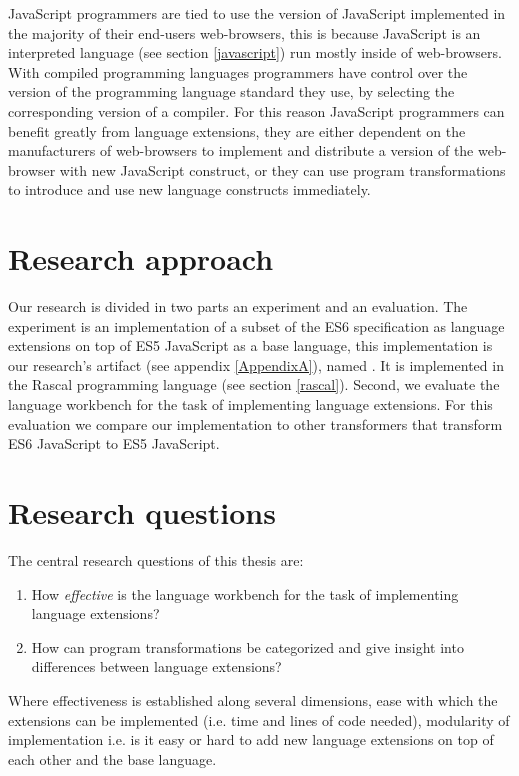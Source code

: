 JavaScript programmers are tied to use the version of JavaScript implemented in the majority of their end-users web-browsers, this is because JavaScript is an interpreted language (see section \ref{javascript}) run mostly inside of web-browsers. With compiled programming languages programmers have control over the version of the programming language standard they use, by selecting the corresponding version of a compiler. For this reason JavaScript programmers can benefit greatly from language extensions, they are either dependent on the manufacturers of web-browsers to implement and distribute a version of the web-browser with new JavaScript construct, or they can use program transformations to introduce and use new language constructs immediately.

\section{Research approach}
Our research is divided in two parts an experiment and an evaluation. The experiment is an implementation of a subset of the ES6 specification as language extensions on top of ES5 JavaScript as a base language, this implementation is our research's artifact (see appendix \ref{AppendixA}), named \textit{\projectname}. It is implemented in the Rascal programming language (see section \ref{rascal}). Second, we evaluate the language workbench for the task of implementing language extensions. For this evaluation we compare our implementation to other transformers that transform ES6 JavaScript to ES5 JavaScript.

\section{Research questions}
The central research questions of this thesis are:

\begin{enumerate}
	\item How \textit{effective} is the language workbench for the task of implementing language extensions?
	\item How can program transformations be categorized and give insight into differences between language extensions?
\end{enumerate}

Where effectiveness is established along several dimensions, ease with which the extensions can be implemented (i.e. time and lines of code needed), modularity of implementation i.e. is it easy or hard to add new language extensions on top of each other and the base language.

